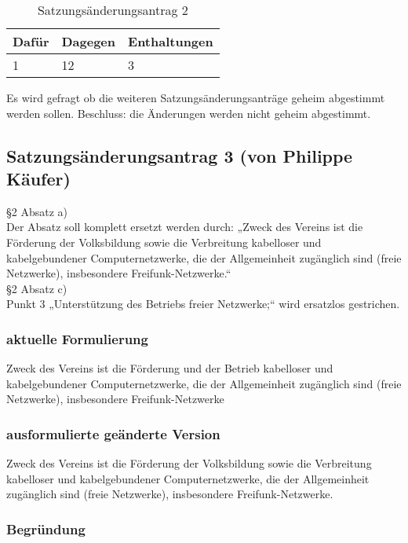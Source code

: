 \documentclass[a4paper]{scrartcl}
\begin{document}
\begin{table}[h]
	\begin{tabularx}{\textwidth}{XXX}
		Dafür & Dagegen & Enthaltungen\\
		\toprule
		1 & 12 & 3\\
	\end{tabularx}
	\caption{Satzungsänderungsantrag 2}
\end{table}

Es wird gefragt ob die weiteren Satzungsänderungsanträge geheim abgestimmt werden sollen. Beschluss: die Änderungen werden nicht geheim abgestimmt.

\subsection{Satzungsänderungsantrag 3 (von Philippe Käufer)}

§2 Absatz a)\\

Der Absatz soll komplett ersetzt werden durch:
„Zweck des Vereins ist die Förderung der Volksbildung sowie die Verbreitung kabelloser und kabelgebundener Computernetzwerke, die der Allgemeinheit zugänglich sind (freie Netzwerke), insbesondere Freifunk-Netzwerke.“\\

§2 Absatz c)\\
Punkt 3 „Unterstützung des Betriebs freier Netzwerke;“ wird ersatzlos gestrichen.

\subsubsection{aktuelle Formulierung}

Zweck des Vereins ist die Förderung und der Betrieb kabelloser und kabelgebundener Computernetzwerke, die der Allgemeinheit zugänglich sind (freie Netzwerke), insbesondere Freifunk-Netzwerke

\subsubsection{ausformulierte geänderte Version}

Zweck des Vereins ist die Förderung der Volksbildung sowie die Verbreitung kabelloser und kabelgebundener Computernetzwerke, die der Allgemeinheit zugänglich sind (freie Netzwerke), insbesondere Freifunk-Netzwerke.

\subsubsection{Begründung}
\end{document}
